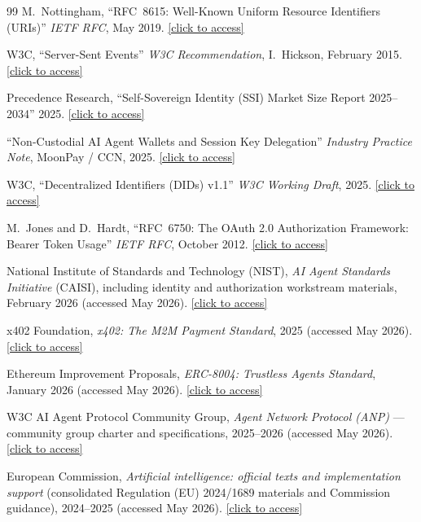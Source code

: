 \documentclass[12pt,a4paper]{article}
\begin{document}
\begin{thebibliography}{99}
M.~Nottingham, ``RFC~8615: Well-Known Uniform Resource Identifiers (URIs)'' \textit{IETF RFC}, May 2019. \href{https://www.rfc-editor.org/rfc/rfc8615}{[click to access]}

W3C, ``Server-Sent Events'' \textit{W3C Recommendation}, I.~Hickson, February 2015. \href{https://www.w3.org/TR/eventsource/}{[click to access]}

Precedence Research, ``Self-Sovereign Identity (SSI) Market Size Report 2025--2034'' 2025. \href{https://www.precedenceresearch.com/}{[click to access]}

``Non-Custodial AI Agent Wallets and Session Key Delegation'' \textit{Industry Practice Note}, MoonPay / CCN, 2025. \href{https://www.ccn.com/}{[click to access]}

W3C, ``Decentralized Identifiers (DIDs) v1.1'' \textit{W3C Working Draft}, 2025. \href{https://www.w3.org/TR/did-1.1/}{[click to access]}

M.~Jones and D.~Hardt, ``RFC~6750: The OAuth 2.0 Authorization Framework: Bearer Token Usage'' \textit{IETF RFC}, October 2012. \href{https://www.rfc-editor.org/rfc/rfc6750}{[click to access]}


National Institute of Standards and Technology (NIST), \textit{AI Agent Standards Initiative} (CAISI), including identity and authorization workstream materials, February 2026 (accessed May 2026). \href{https://www.nist.gov/caisi/ai-agent-standards-initiative}{[click to access]}

x402 Foundation, \textit{x402: The M2M Payment Standard}, 2025 (accessed May 2026). \href{https://x402.org}{[click to access]}

Ethereum Improvement Proposals, \textit{ERC-8004: Trustless Agents Standard}, January 2026 (accessed May 2026). \href{https://eips.ethereum.org/EIPS/eip-8004}{[click to access]}

W3C AI Agent Protocol Community Group, \textit{Agent Network Protocol (ANP)} — community group charter and specifications, 2025--2026 (accessed May 2026). \href{https://www.w3.org/community/agentprotocol/}{[click to access]}

European Commission, \textit{Artificial intelligence: official texts and implementation support} (consolidated Regulation (EU) 2024/1689 materials and Commission guidance), 2024--2025 (accessed May 2026). \href{https://digital-strategy.ec.europa.eu/en/policies/european-approach-artificial-intelligence}{[click to access]}


\end{thebibliography}
\end{document}
